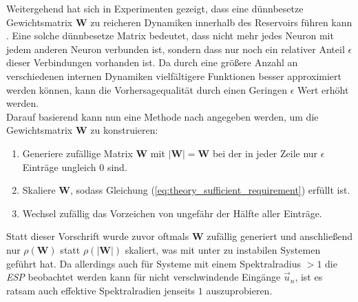 Weitergehend hat sich in Experimenten gezeigt, dass eine dünnbesetze Gewichtsmatrix $\mathbf{W}$ zu reicheren Dynamiken innerhalb des Reservoirs führen kann \citep{jaeger2010}. Eine solche dünnbesetze Matrix bedeutet, dass nicht mehr jedes Neuron mit jedem anderen Neuron verbunden ist, sondern dass nur noch ein relativer Anteil $\epsilon$ dieser Verbindungen vorhanden ist. Da durch eine größere Anzahl an verschiedenen internen Dynamiken vielfältigere Funktionen besser approximiert werden können, kann die Vorhersagequalität durch einen Geringen $\epsilon$ Wert erhöht werden.\\

Darauf basierend kann nun eine Methode nach \cite{yildiz} angegeben werden, um die Gewichtsmatrix $\mathbf{W}$ zu konstruieren:

\singlespacing
\begin{enumerate}
	\item Generiere zufällige Matrix $\mathbf{W}$ mit $\mathbf{|W|} = \mathbf{W}$ bei der in jeder Zeile nur $\epsilon$ Einträge ungleich $0$ sind.
	\item Skaliere $\mathbf{W}$, sodass Gleichung (\ref{eq:theory_sufficient_requirement}) erfüllt ist.
	\item Wechsel zufällig das Vorzeichen von ungefähr der Hälfte aller Einträge.
\end{enumerate}
\onehalfspacing

Statt dieser Vorschrift wurde zuvor oftmals $\mathbf{W}$ zufällig generiert und anschließend nur $\rho(\mathbf{W})$ statt $\rho(|\mathbf{W}|)$ skaliert, was mit unter zu instabilen Systemen geführt hat. Da allerdings auch für Systeme mit einem Spektralradius $ > 1$ die \textit{ESP} beobachtet werden kann für nicht verschwindende Eingänge $\vec{u}_n$, ist es ratsam auch effektive Spektralradien jenseits $1$ auszuprobieren.